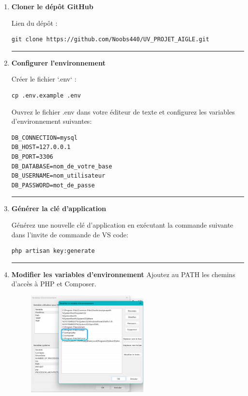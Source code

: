 \begin{enumerate}
    \item \textbf{Cloner le dépôt GitHub}

Lien du dépôt :
        \begin{lstlisting}
git clone https://github.com/Noobs440/UV_PROJET_AIGLE.git
        \end{lstlisting}
\rule{\linewidth}{0.2pt}
    \item \textbf{Configurer l’environnement}

Créer le fichier `.env` :
        \begin{lstlisting}
cp .env.example .env
        \end{lstlisting}
Ouvrez le fichier .env dans votre éditeur de texte et configurez les variables d'environnement suivantes:
        \begin{lstlisting}
DB_CONNECTION=mysql
DB_HOST=127.0.0.1
DB_PORT=3306
DB_DATABASE=nom_de_votre_base
DB_USERNAME=nom_utilisateur
DB_PASSWORD=mot_de_passe
        \end{lstlisting}
\rule{\linewidth}{0.2pt}
    \item \textbf{Générer la clé d'application}

Générez une nouvelle clé d'application en exécutant la commande suivante dans l'invite de commande de  VS code:
        \begin{lstlisting}
php artisan key:generate
        \end{lstlisting}
\rule{\linewidth}{0.2pt}
    \item \textbf{Modifier les variables d’environnement}
Ajoutez au PATH les chemins d'accès à PHP et Composer.  
    \begin{figure}[h] 
            \centering 
            \includegraphics[width=0.58\textwidth]{./img/path.png} 
        \end{figure}


\end{enumerate}
